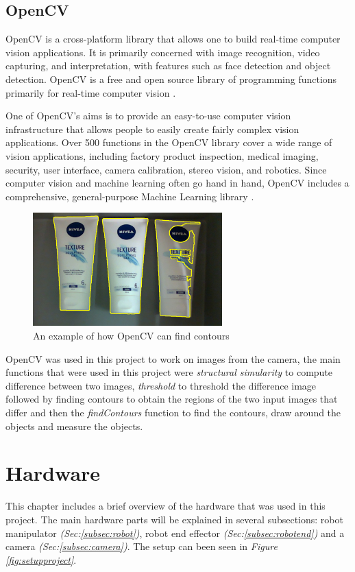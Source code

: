 \subsection{OpenCV}
OpenCV is a cross-platform library that allows one to build real-time computer vision applications. It is primarily concerned with image recognition, video capturing, and interpretation, with features such as face detection and object detection. OpenCV is a free and open source library of programming functions primarily for real-time computer vision \cite{noauthor_opencv_nodate}.

One of OpenCV's aims is to provide an easy-to-use computer vision infrastructure that allows people to easily create fairly complex vision applications. Over 500 functions in the OpenCV library cover a wide range of vision applications, including factory product inspection, medical imaging, security, user interface, camera calibration, stereo vision, and robotics. Since computer vision and machine learning often go hand in hand, OpenCV includes a comprehensive, general-purpose Machine Learning library \cite{kaehler_what_2016}.

\begin{figure}[h]
    \centering
    \includegraphics[width=0.65\textwidth]{graphics/contour.PNG}
    \caption{An example of how OpenCV can find contours}
    \label{fig:opencvcontour}
\end{figure}

OpenCV was used in this project to work on images from the camera, the main functions that were used in this project were \textit{structural simularity} to compute difference between two images,  \textit{threshold} to threshold the difference image followed by finding contours to obtain the regions of the two input images that differ and then the \textit{findContours} function to find the contours, draw around the objects and measure the objects.

\clearpage
\section{Hardware \label{sec:hardware}}
This chapter includes a brief overview of the hardware that was used in this project. The main hardware parts will be explained in several subsections: robot manipulator \textit{(Sec:\ref{subsec:robot})}, robot end effector \textit{(Sec:\ref{subsec:robotend})} and a camera \textit{(Sec:\ref{subsec:camera})}. The setup can been seen in \textit{Figure \ref{fig:setupproject}}.

